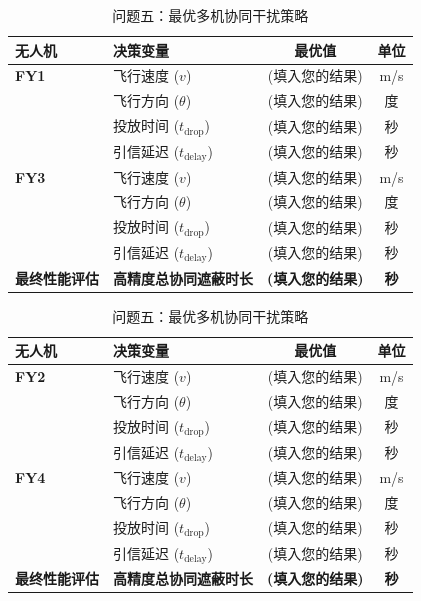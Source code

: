\documentclass[12pt]{article}
\begin{document}
\begin{CJK}{UTF8}{gbsn}
		\begin{table}[H]
			\centering
			\caption{问题五：最优多机协同干扰策略}
			\label{tab:q51_results}
				\begin{tabular}{@{}llcc@{}}
					\toprule
					\textbf{无人机} & \textbf{决策变量} & \textbf{最优值} & \textbf{单位} \\
					\midrule
					\textbf{FY1} & 飞行速度 ($v$) & (填入您的结果) & m/s \\
					& 飞行方向 ($\theta$) & (填入您的结果) & 度 \\
					& 投放时间 ($t_{\text{drop}}$) & (填入您的结果) & 秒 \\
					& 引信延迟 ($t_{\text{delay}}$) & (填入您的结果) & 秒 \\
					\midrule
					\textbf{FY3} & 飞行速度 ($v$) & (填入您的结果) & m/s \\
					& 飞行方向 ($\theta$) & (填入您的结果) & 度 \\
					& 投放时间 ($t_{\text{drop}}$) & (填入您的结果) & 秒 \\
					& 引信延迟 ($t_{\text{delay}}$) & (填入您的结果) & 秒 \\
					\midrule
					\textbf{最终性能评估} & \textbf{高精度总协同遮蔽时长} & \textbf{(填入您的结果)} & \textbf{秒} \\
					\bottomrule
				\end{tabular}
			\end{table}
			
		\begin{table}[H]
			\centering
			\caption{问题五：最优多机协同干扰策略}
			\label{tab:q52_results}
				\begin{tabular}{@{}llcc@{}}
					\toprule
					\textbf{无人机} & \textbf{决策变量} & \textbf{最优值} & \textbf{单位} \\
					\midrule
					\textbf{FY2} & 飞行速度 ($v$) & (填入您的结果) & m/s \\
					& 飞行方向 ($\theta$) & (填入您的结果) & 度 \\
					& 投放时间 ($t_{\text{drop}}$) & (填入您的结果) & 秒 \\
					& 引信延迟 ($t_{\text{delay}}$) & (填入您的结果) & 秒 \\
					\midrule
					\textbf{FY4} & 飞行速度 ($v$) & (填入您的结果) & m/s \\
					& 飞行方向 ($\theta$) & (填入您的结果) & 度 \\
					& 投放时间 ($t_{\text{drop}}$) & (填入您的结果) & 秒 \\
					& 引信延迟 ($t_{\text{delay}}$) & (填入您的结果) & 秒 \\
					\midrule
					\textbf{最终性能评估} & \textbf{高精度总协同遮蔽时长} & \textbf{(填入您的结果)} & \textbf{秒} \\
					\bottomrule
				\end{tabular}
			\end{table}
			

\end{CJK}
\end{document}
